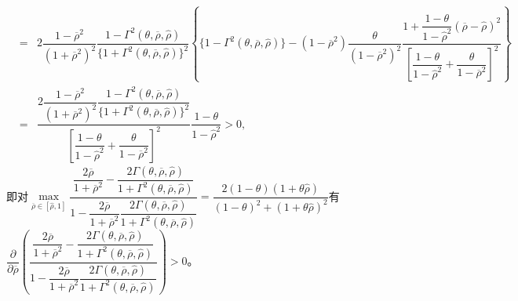 \documentclass[10.0pt]{article}
\begin{document}
{\begin{eqnarray*}
& = & 2 \dfrac{1 - \overline{\rho}^2}{(1 + \overline{\rho}^2)^2} \dfrac{1 - \Gamma^2 (\theta, \overline{\rho}, {\hat \rho})}{\{ 1 + \Gamma^2 (\theta, \overline{\rho}, {\hat \rho}) \}^2} \left\{ \{ 1 - \Gamma^2 (\theta, \overline{\rho}, {\hat \rho}) \} - (1 - \overline{\rho}^2) \dfrac{\theta}{(1 - \overline{\rho}^2)^2} \dfrac{1 + \dfrac{1 - \theta}{1 - {\hat \rho}^2} (\overline{\rho} - \hat{\rho})^2}{\left[ \dfrac{1 - \theta}{1 - {\hat \rho}^2} + \dfrac{\theta}{1 - \overline{\rho}^2} \right]^2} \right\} \\
& = & \dfrac{2 \dfrac{1 - \overline{\rho}^2}{(1 + \overline{\rho}^2)^2} \dfrac{1 - \Gamma^2 (\theta, \overline{\rho}, {\hat \rho})}{\{ 1 + \Gamma^2 (\theta, \overline{\rho}, {\hat \rho}) \}^2}}{\left[ \dfrac{1 - \theta}{1 - {\hat \rho}^2} + \dfrac{\theta}{1 - \overline{\rho}^2} \right]^2} \dfrac{1 - \theta}{1 - {\hat \rho}^2} > 0,
\end{eqnarray*}}
即对{\footnotesize $ \max\limits_{\overline{\rho} \in [\hat{\rho}, 1]} \dfrac{\dfrac{2 \overline{\rho}}{1 + \overline{\rho}^2} - \dfrac{2 \Gamma (\theta, \overline{\rho}, {\hat \rho})}{1 + \Gamma^2 (\theta, \overline{\rho}, {\hat \rho})}}{1 - \dfrac{2 \overline{\rho}}{1 + \overline{\rho}^2} \dfrac{2 \Gamma (\theta, \overline{\rho}, {\hat \rho})}{1 + \Gamma^2 (\theta, \overline{\rho}, {\hat \rho})}} = \dfrac{2 (1 - \theta) (1 + \theta \hat{\rho})}{(1 - \theta)^2 + (1 + \theta\hat{\rho})^2} $}有{\footnotesize $ \dfrac{\partial}{\partial \overline{\rho}} \left( \dfrac{\dfrac{2 \overline{\rho}}{1 + \overline{\rho}^2} - \dfrac{2 \Gamma (\theta, \overline{\rho}, {\hat \rho})}{1 + \Gamma^2 (\theta, \overline{\rho}, {\hat \rho})}}{1 - \dfrac{2 \overline{\rho}}{1 + \overline{\rho}^2} \dfrac{2 \Gamma (\theta, \overline{\rho}, {\hat \rho})}{1 + \Gamma^2 (\theta, \overline{\rho}, {\hat \rho})}} \right) > 0 $}。 
\end{document}
